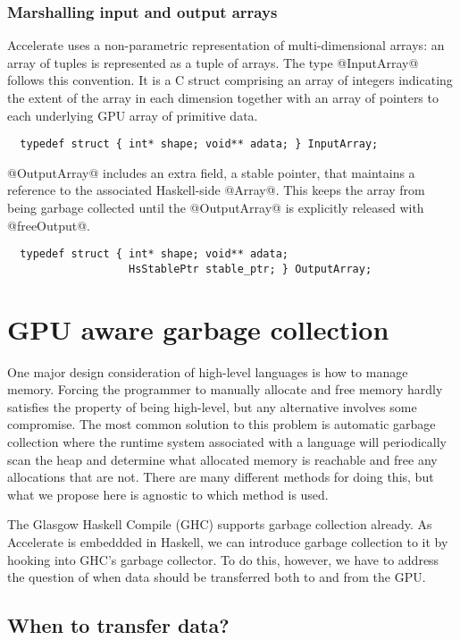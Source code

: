 \subsubsection{Marshalling input and output arrays}

Accelerate uses a non-parametric representation of multi-dimensional arrays: an array of tuples is represented as a tuple of arrays. The type @InputArray@ follows this convention. It is a C struct comprising an array of integers indicating the extent of the array in each dimension together with an array of pointers to each underlying GPU array of primitive data.
%
\begin{lstlisting}
  typedef struct { int* shape; void** adata; } InputArray;
\end{lstlisting}
%

@OutputArray@ includes an extra field, a stable pointer, that maintains a reference to the associated Haskell-side @Array@. This keeps the array from being garbage collected until the @OutputArray@ is explicitly released with @freeOutput@.
%
\begin{lstlisting}
  typedef struct { int* shape; void** adata;
                   HsStablePtr stable_ptr; } OutputArray;
\end{lstlisting}
%


\section{GPU aware garbage collection}
\label{sec:gpu-gc}

One major design consideration of high-level languages is how to manage memory. Forcing the programmer to manually allocate and free memory hardly satisfies the property of being high-level, but any alternative involves some compromise. The most common solution to this problem is automatic garbage collection where the runtime system associated with a language will periodically scan the heap and determine what allocated memory is reachable and free any allocations that are not. There are many different methods for doing this, but what we propose here is agnostic to which method is used.

The Glasgow Haskell Compile (GHC) supports garbage collection already. As Accelerate is embeddded in Haskell, we can introduce garbage collection to it by hooking into GHC's garbage collector. To do this, however, we have to address the question of when data should be transferred both to and from the GPU.

\subsection{When to transfer data?}

